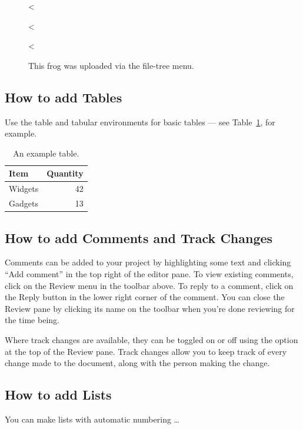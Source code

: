 \documentclass{article}
\begin{document}
\begin{figure}
\centering
<%
\caption{\label{fig:image}The IIT Mandi logo. You can add it to any document with Insert > IIT Mandi logo.}<%
\caption{\label{fig:image}This frog was uploaded via the file-tree menu.}<%
\end{figure}

\subsection{How to add Tables}

Use the table and tabular environments for basic tables --- see Table~\ref{tab:widgets}, for example.

\begin{table}
\centering
\begin{tabular}{l|r}
Item & Quantity \\\hline
Widgets & 42 \\
Gadgets & 13
\end{tabular}
\caption{\label{tab:widgets}An example table.}
\end{table}

\subsection{How to add Comments and Track Changes}

Comments can be added to your project by highlighting some text and clicking ``Add comment'' in the top right of the editor pane. To view existing comments, click on the Review menu in the toolbar above. To reply to a comment, click on the Reply button in the lower right corner of the comment. You can close the Review pane by clicking its name on the toolbar when you're done reviewing for the time being.

Where track changes are available, they can be toggled on or off using the option at the top of the Review pane. Track changes allow you to keep track of every change made to the document, along with the person making the change.

\subsection{How to add Lists}

You can make lists with automatic numbering \dots
\end{document}
